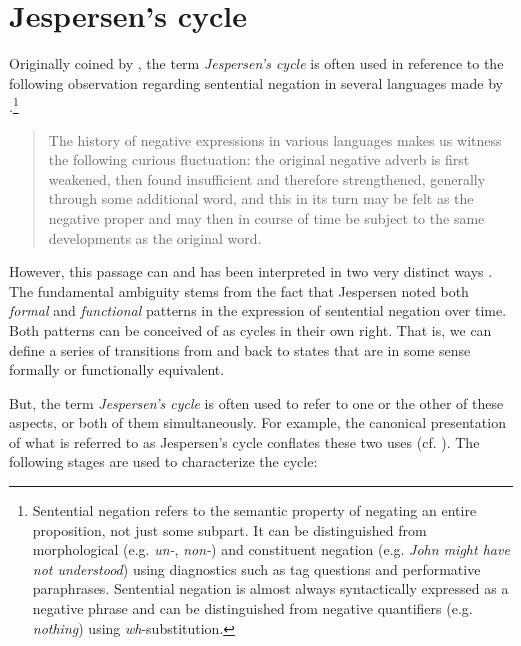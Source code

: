 \documentclass[linguex]{sp}
\theoremstyle{definition} \newtheorem{definition}{Definition}
\begin{document}
\section{Jespersen's cycle}
\label{Jespersen's cycle}


Originally coined by \citet[88]{dahl:1979}, the term \emph{Jespersen's cycle} is often used in reference to the following observation regarding sentential negation in several languages made by \citet[4]{jespersen:1917}.\footnote{Sentential negation refers to the semantic property of negating an entire proposition, not just some subpart. It can be distinguished from morphological (e.g. \emph{un-}, \emph{non-}) and constituent negation (e.g. \emph{John might have not understood}) using diagnostics such as tag questions and performative paraphrases. Sentential negation is almost always syntactically expressed as a negative phrase and can be distinguished from negative quantifiers (e.g. \emph{nothing}) using \emph{wh}-substitution.}

\begin{quote}
The history of negative expressions in various languages makes us witness the following curious fluctuation: the original negative adverb is first weakened, then found insufficient and therefore strengthened, generally through some additional word, and this in its turn may be felt as the negative proper and may then in course of time be subject to the same developments as the original word.
\end{quote}
However, this passage can and has been interpreted in two very distinct ways \citep{vanderAuwera2009}. The fundamental ambiguity stems from the fact that Jespersen noted both \emph{formal} and \emph{functional} patterns in the expression of sentential negation over time. Both patterns can be conceived of as cycles in their own right. That is, we can define a series of transitions from and back to states that are in some sense formally or functionally equivalent. 

But, the term \emph{Jespersen's cycle} is often used to refer to one or the other of these aspects, or both of them simultaneously. For example, the canonical presentation of what is referred to as Jespersen's cycle conflates these two uses (cf. \citealt{posner1985,schwegler1988,ladusaw1993}). The following stages are used to characterize the cycle:
\end{document}
